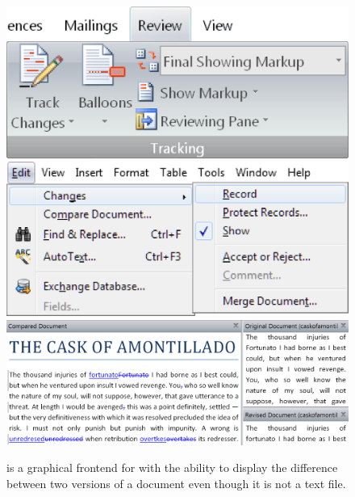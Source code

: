 \begin{figure}
  \includegraphics[width=\textwidth]{examples/01/word.png}\nextimage
  \includegraphics[width=\textwidth]{examples/01/openoffice.png}
  \includegraphics[width=\textwidth]{examples/01/tortoise-svn.png}
  \caption{ is a graphical frontend for
     with the ability to display the difference between two versions
    of a  document even though it is not a text file.}
\end{figure}

